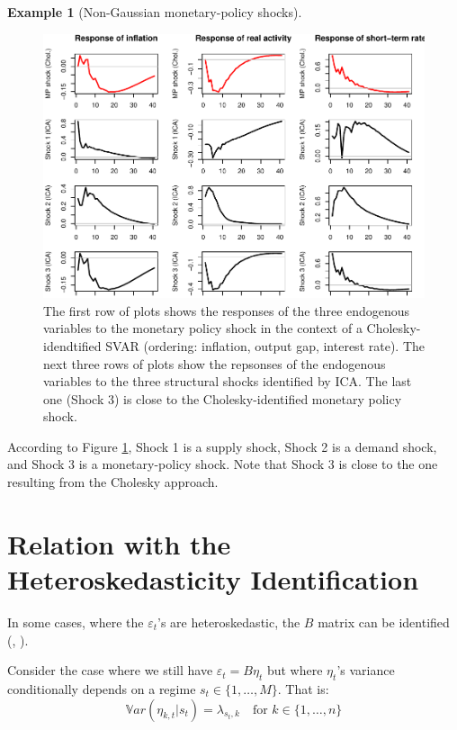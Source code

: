 \documentclass[
  12pt,
]{book}
\theoremstyle{definition}
\theoremstyle{definition}
\newtheorem{example}{Example}[chapter]
\theoremstyle{definition}
\theoremstyle{definition}
\theoremstyle{remark}
\begin{document}
\begin{example}[Non-Gaussian monetary-policy shocks]
\begin{figure}
\includegraphics[width=0.95\linewidth]{IdentifStructShocks_files/figure-latex/ICAFigIRF-1} \caption{The first row of plots shows the responses of the three endogenous variables to the monetary policy shock in the context of a Cholesky-idendtified SVAR (ordering: inflation, output gap, interest rate). The next three rows of plots show the repsonses of the endogenous variables to the three structural shocks identified by ICA. The last one (Shock 3) is close to the Cholesky-identified monetary policy shock.}\label{fig:ICAFigIRF}
\end{figure}

According to Figure \ref{fig:ICAFigIRF}, Shock 1 is a supply shock, Shock 2 is a demand shock, and Shock 3 is a monetary-policy shock. Note that Shock 3 is close to the one resulting from the Cholesky approach.
\end{example}

\section{Relation with the Heteroskedasticity Identification}\label{relation-with-the-heteroskedasticity-identification}

In some cases, where the \(\varepsilon_t\)'s are heteroskedastic, the \(B\) matrix can be identified (\citet{Rigobon_2003}, \citet{LANNE2010121}).

Consider the case where we still have \(\varepsilon_t = B \eta_t\) but where \(\eta_t\)'s variance conditionally depends on a regime \(s_t \in \{1,\dots,M\}\). That is:
\[
\mathbb{V}ar(\eta_{k,t}|s_t) = \lambda_{s_t,k} \quad \mbox{for } k \in \{1,\dots,n\}
\]
\end{document}

